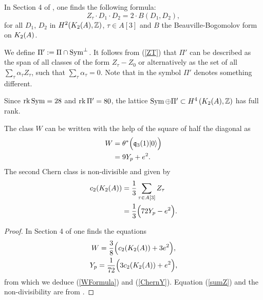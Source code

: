 In Section 4 of \cite{Hassett}, one finds the following formula:
\begin{equation}
Z_{\tau}\cdot D_{1}\cdot D_{2}=2\cdot B(D_{1},D_{2}),
\label{ZT}
\end{equation}
for all $D_{1}$, $D_{2}$ in $H^{2}(K_{ 2 }( A ),\mathbb{Z})$, $\tau\in A[3]$ and $B$ the Beauville-Bogomolov form on $K_{ 2 }( A )$.

\begin{definition}\label{defiPi}
We define $\Pi' := \Pi \cap \operatorname{Sym}^{\perp}$. It follows from (\ref{ZT}) that $\Pi'$ can be described as the span of all classes of the form $Z_\tau -Z_0$ or alternatively as the set of all
$
\sum_\tau \alpha_\tau Z_\tau $, such that $ \sum_\tau \alpha_\tau =0$.
Note that in \cite{Hassett} the symbol $\Pi'$ denotes something different.
\end{definition}
\begin{remark}
Since $\operatorname{rk} \operatorname{Sym} = 28$ and $\operatorname{rk} \Pi' = 80$, the lattice $\operatorname{Sym}\oplus\Pi'\subset H^4\left(K_{ 2 }( A ),\mathbb{Z}\right)$ has full rank.
\end{remark}

\begin{proposition}
The class $W$ can be written with the help of the square of half the diagonal as
\begin{align} 
W &= \theta^*\Big( \mathfrak{q}_3(1)|0\rangle \Big) \\
\label{WFormula}
&= 9 Y_p + e^2.
\end{align}
The second Chern class is non-divisible and given by 
\begin{align}
\label{sumZ}
c_2(K_{ 2 }( A )) &= \frac{1}{3}\sum_{\tau\in A[3] } Z_\tau \\
\label{ChernY}
&= \frac{1}{3} \Big(72Y_p-e^2 \Big). 
\end{align}
\end{proposition}
\begin{proof} 
In Section 4 of \cite{Hassett} one finds the equations
\begin{gather}
W = \frac{3}{8}\Big(c_2(K_{ 2 }( A )) + 3e^2\Big),\label{WW} \\
Y_p = \frac{1}{72}\Big(3c_2(K_{ 2 }( A )) + e^2\Big),
\end{gather}
from which we deduce (\ref{WFormula}) and (\ref{ChernY}).
Equation (\ref{sumZ}) and the non-divisibility are from \cite[Proposition 5.1]{Hassett}.
\end{proof}
